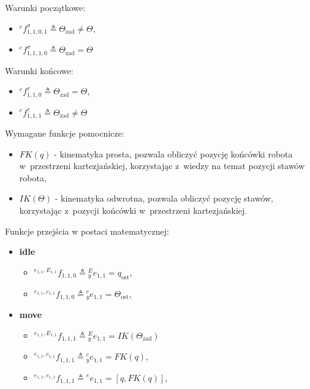 Warunki początkowe:
\begin{itemize}
    \item ${}^{e}f^{\sigma}_{1,1,0,1} \triangleq \Theta_{\mathrm{zad}} \neq \Theta$,
    \item ${}^{e}f^{\sigma}_{1,1,1,0} \triangleq \Theta_{\mathrm{zad}} = \Theta$
\end{itemize}

Warunki końcowe:
\begin{itemize}
    \item ${}^{e}f^{\tau}_{1,1,0} \triangleq \Theta_{\mathrm{zad}} = \Theta$,
    \item ${}^{e}f^{\tau}_{1,1,1} \triangleq \Theta_{\mathrm{zad}} \neq \Theta$
\end{itemize}

Wymagane funkcje pomocnicze:
\begin{itemize}
    \item $FK(q)$ - kinematyka prosta, pozwala obliczyć pozycję końcówki robota w~przestrzeni kartezjańskiej, korzystając z~wiedzy na temat pozycji stawów robota,
    \item $IK(\Theta)$ - kinematyka odwrotna, pozwala obliczyć pozycję stawów, korzystając z~pozycji końcówki w~przestrzeni kartezjańskiej.
\end{itemize}

Funkcje przejścia w postaci matematycznej:
\begin{itemize}
    \item \textbf{idle} \begin{itemize}
        \item ${}^{e_{1,1}, E_{1,1}}f_{1,1,0} \triangleq {}^{E}_{y}e_{1,1} = q_{\mathrm{ost}}$,
        \item ${}^{e_{1,1}, c_{1,1}}f_{1,1,0} \triangleq {}^{c}_{y}e_{1,1} = \Theta_{\mathrm{ost}}$,
    \end{itemize} 
    \item \textbf{move} \begin{itemize}
        \item ${}^{e_{1,1}, E_{1,1}}f_{1,1,1} \triangleq {}^{E}_{y}e_{1,1} = IK(\Theta_{\mathrm{zad}})$
        \item ${}^{e_{1,1}, c_{1,1}}f_{1,1,1} \triangleq {}^{c}_{y}e_{1,1} = FK(q)$,
        \item ${}^{e_{1,1}, e_{1,1}}f_{1,1,1} \triangleq {}^{e}e_{1,1} = [q, FK(q)]$,
    \end{itemize}
\end{itemize}

